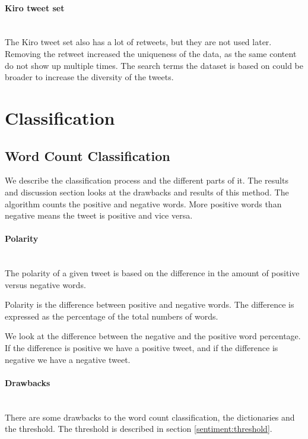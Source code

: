 \paragraph{Kiro tweet set}
\hspace{0pt}\\
The Kiro tweet set also has a lot of retweets, but they are not used later.
Removing the retweet increased the uniqueness of the data, as the same content
do not show up multiple times. The search terms the dataset is based on
could be broader to increase the diversity of the tweets.
%

\section{Classification}\label{sentiment:classification}
\subsection{Word Count Classification}\label{sentiment:word_count_classification}
We describe the classification process and the different parts of it. The
results and discussion section looks at the drawbacks and results of this method.
The algorithm counts the positive and negative words. More positive words than
negative means the tweet is positive and vice versa. 

\paragraph{Polarity} 
\hspace{0pt}\\ 
The polarity of a given tweet is based on the difference in the amount of
positive versus negative words. 

Polarity is the difference between positive and negative words. The difference is
expressed as the percentage of the total numbers of words.  

We look at the difference between the negative and the positive word
percentage. If the difference is positive we have a positive tweet, and if the
difference is negative we have a negative tweet.

\paragraph{Drawbacks}
\hspace{0pt}\\
There are some drawbacks to the word count classification, the dictionaries
and the threshold. The threshold is described in section
\ref{sentiment:threshold}. 

